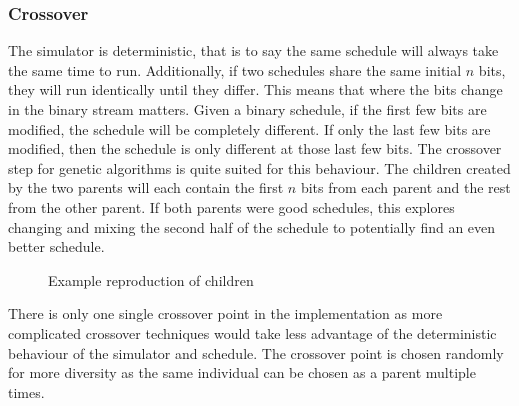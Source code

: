 \documentclass{article}
\def\listset{\pgfqkeys{/List}}
\begin{document}
\subsubsection{Crossover}
The simulator is deterministic, that is to say the same schedule will always take the same time to run. Additionally, if two schedules share the same initial $n$ bits, they will run identically until they differ. This means that where the bits change in the binary stream matters. Given a binary schedule, if the first few bits are modified, the schedule will be completely different. If only the last few bits are modified, then the schedule is only different at those last few bits. The crossover step for genetic algorithms is quite suited for this behaviour. The children created by the two parents will each contain the first $n$ bits from each parent and the rest from the other parent. If both parents were good schedules, this explores changing and mixing the second half of the schedule to potentially find an even better schedule. 
\begin{figure}[H]
\centering
{}
\caption{Example reproduction of children}
\label{fig:crossover}
\end{figure}
\noindent There is only one single crossover point in the implementation as more complicated crossover techniques would take less advantage of the deterministic behaviour of the simulator and schedule. The crossover point is chosen randomly for more diversity as the same individual can be chosen as a parent multiple times. 
\end{document}
